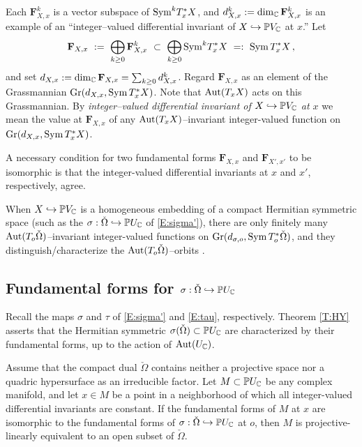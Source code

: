 \documentclass[12pt]{amsart}
\numberwithin{equation}{section}
\numberwithin{table}{section}
\numberwithin{figure}{section}
\begin{document}
Each $\mathbf{F}^k_{X,x}$ is a vector subspace of $\mathrm{Sym}^k T^*_xX$, and $d_{X,x}^k := \mathrm{dim}_\mathbb C\,\mathbf{F}^k_{X,x}$ is an example of an ``integer--valued differential invariant of $X \hookrightarrow \mathbb P V_\mathbb C$ at $x$.''  Let
\[
  \mathbf{F}_{X,x} \ := \ 
  \bigoplus_{k\ge0} \mathbf{F}^k_{X ,x}\ \subset \ 
  \bigoplus_{k\ge0} \tSym^k T^*_xX \ =: \ 
  \tSym\,T^*_xX \,,
\]
and set $d_{X,x} := \mathrm{dim}_\mathbb C\,\mathbf{F}_{X,x} = \sum_{k\ge0} d^k_{X,x}$.  Regard $\mathbf{F}_{X,x}$ as an element of the Grassmannian $\mathrm{Gr}(d_{X,x},\mathrm{Sym}\,T^*_xX)$.  Note that $\mathrm{Aut}(T_xX)$ acts on this Grassmannian.  By \emph{integer--valued differential invariant of $X \hookrightarrow \mathbb P V_\mathbb C$ at $x$} we mean the value at $\mathbf{F}_{X,x}$ of any $\mathrm{Aut}(T_xX)$--invariant integer-valued function on $\mathrm{Gr}(d_{X,x},\mathrm{Sym}\,T^*_xX)$.

A necessary condition for two fundamental forms $\mathbf{F}_{X,x}$ and $\mathbf{F}_{X',x'}$ to be isomorphic is that the integer-valued differential invariants at $x$ and $x'$, respectively, agree.

\begin{remark}
When $X \hookrightarrow \mathbb P V_\mathbb C$ is a homogeneous embedding of a compact Hermitian symmetric space (such as the $\sigma : \check \Omega \hookrightarrow \mathbb P U_\mathbb C$ of \eqref{E:sigma'}), there are only finitely many $\mathrm{Aut}(T_o\check\Omega)$--invariant integer-valued functions on $\mathrm{Gr}(d_{\sigma,o},\mathrm{Sym}\,T^*_o\check\Omega)$, and they distinguish/characterize the $\mathrm{Aut}(T_o\check\Omega)$--orbits \cite[Proposition 5]{MR2030098}.
\end{remark}

\subsection{Fundamental forms for $\sigma:\check\Omega\hookrightarrow \mathbb P U_\mathbb C$}

Recall the maps $\sigma$ and $\tau$ of \eqref{E:sigma'} and \eqref{E:tau}, respectively.  Theorem \ref{T:HY} asserts that the Hermitian symmetric $\sigma(\check\Omega) \subset \mathbb P U_\mathbb C$ are characterized by their fundamental forms, up to the action of $\mathrm{Aut}(U_\mathbb C)$.

\begin{theorem} \label{T:HY}
Assume that the compact dual $\check \Omega$ contains neither a projective space nor a quadric hypersurface as an irreducible factor.  Let $M \subset \mathbb P U_\mathbb C$ be any complex manifold, and let $x \in M$ be a point in a neighborhood of which all integer-valued differential invariants are constant.  If the fundamental forms of $M$ at $x$ are isomorphic to the fundamental forms of $\sigma : \check\Omega \hookrightarrow \mathbb P U_\mathbb C$ at $o$, then $M$ is projective-linearly equivalent to an open subset of $\check\Omega$.
\end{theorem}
\end{document}
